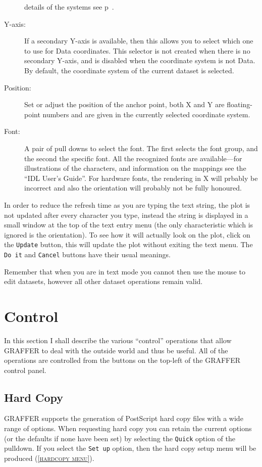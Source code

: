 \documentclass[11pt,twoside,english]{article}
\begin{document}
\begin{description}
  details of the systems see p~\pageref{coordsys}.
\item[Y-axis:] If a secondary Y-axis is available, then this allows you
  to select which one to use for Data coordinates. This selector is not
  created when there is no secondary Y-axis, and is disabled when the
  coordinate system is not Data. By default, the coordinate system of
  the current dataset is selected.
\item [Position:]Set or adjust the position of the anchor point, both X
  and Y are floating-point numbers and are given in the currently
  selected coordinate system.
\item [Font:] A pair of pull downs to select the font. The first
  selects the font group, and the second the specific font. All the
  recognized fonts are available---for illustrations of the characters,
  and information on the mappings see the ``IDL User's Guide''. For
  hardware fonts, the rendering in X will prbably be incorrect and also
  the orientation will probably not be fully honoured.
\end{description}
In order to reduce the refresh time as you are typing the text string,
the plot is not updated after every character you type, instead the
string is displayed in a small window at the top of the text entry menu
(the only characteristic which is ignored is the orientation).  To see
how it will actually look on the plot, click on the \texttt{Update}
button, this will update the plot without exiting the text menu. The
\texttt{Do it} and \texttt{Cancel} buttons have their usual meanings.

Remember that when you are in text mode you cannot then use the mouse
to edit datasets, however all other dataset operations remain valid.


\section{Control}

In this section I shall describe the various {}``control'' operations
that allow GRAFFER to deal with the outside world and thus be useful.
All of the operations are controlled from the buttons on the top-left
of the GRAFFER control panel.


\subsection{Hard Copy}

GRAFFER supports the generation of PostScript hard copy files with a
wide range of options. When requesting hard copy you can retain the
current options (or the defaults if none have been set) by selecting
the \texttt{Quick} option of the pulldown. If you select the
\texttt{Set up} option, then the hard copy setup menu will be produced
(\textsc{\autoref{hardcopy menu}}).
\end{document}
